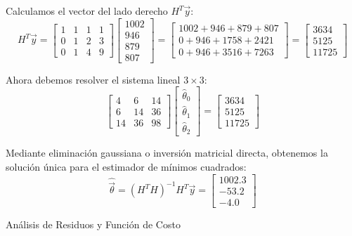 Calculamos el vector del lado derecho $H^T \vec{y}$:
$$ H^T \vec{y} = \begin{bmatrix} 1 & 1 & 1 & 1 \\ 0 & 1 & 2 & 3 \\ 0 & 1 & 4 & 9 \end{bmatrix} \begin{bmatrix} 1002 \\ 946 \\ 879 \\ 807 \end{bmatrix} = \begin{bmatrix} 1002 + 946 + 879 + 807 \\ 0 + 946 + 1758 + 2421 \\ 0 + 946 + 3516 + 7263 \end{bmatrix} = \begin{bmatrix} 3634 \\ 5125 \\ 11725 \end{bmatrix} $$

Ahora debemos resolver el sistema lineal $3 \times 3$:
$$ \begin{bmatrix} 4 & 6 & 14 \\ 6 & 14 & 36 \\ 14 & 36 & 98 \end{bmatrix} \begin{bmatrix} \hat{\theta}_0 \\ \hat{\theta}_1 \\ \hat{\theta}_2 \end{bmatrix} = \begin{bmatrix} 3634 \\ 5125 \\ 11725 \end{bmatrix} $$

Mediante eliminación gaussiana o inversión matricial directa, obtenemos la solución única para el estimador de mínimos cuadrados:
$$ \hat{\vec{\theta}} = (H^T H)^{-1} H^T \vec{y} = \begin{bmatrix} 1002.3 \\ -53.2 \\ -4.0 \end{bmatrix} $$

Análisis de Residuos y Función de Costo

